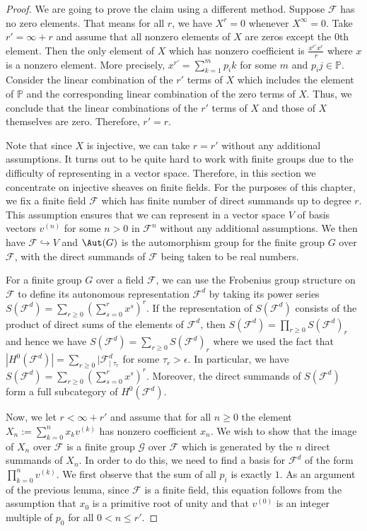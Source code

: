 \documentclass[a4paper,reqno,oneside]{article}
\begin{document}
\begin{proof}
We are going to prove the claim using a different method. Suppose $\mathcal{F}$ has no zero elements. That means for all $r$, we have $X^{r}=0$ whenever $X^{\infty}=0$. Take $r'=\infty+r$ and assume that all nonzero elements of $X$ are zeros except the $0$th element. Then the only element of $X$ which has nonzero coefficient is $\frac{x^{r'}x^r}{r}$ where $x$ is a nonzero element. More precisely, $x^{r'}=\sum_{k=1}^m p_ik$ for some $m$ and $p_ij\in\mathbb{P}$. Consider the linear combination of the $r'$ terms of $X$ which includes the element of $\mathbb{P}$ and the corresponding linear combination of the zero terms of $X$. Thus, we conclude that the linear combinations of the $r'$ terms of $X$ and those of $X$ themselves are zero. Therefore, $r'=r$. 

Note that since $X$ is injective, we can take $r=r'$ without any additional assumptions. It turns out to be quite hard to work with finite groups due to the difficulty of representing in a vector space. Therefore, in this section we concentrate on injective sheaves on finite fields. For the purposes of this chapter, we fix a finite field $\mathcal{F}$ which has finite number of direct summands up to degree $r$. This assumption ensures that we can represent in a vector space $V$ of basis vectors $v^{(n)}$ for some $n>0$ in $\mathcal{F}^n$ without any additional assumptions. We then have $\mathcal{F}\hookrightarrow V$ and $\Aut(G)$ is the automorphism group for the finite group $G$ over $\mathcal{F}$, with the direct summands of $\mathcal{F}$ being taken to be real numbers. 

For a finite group $G$ over a field $\mathcal{F}$, we can use the Frobenius group structure on $\mathcal{F}$ to define its autonomous representation $\mathcal{F}^d$ by taking its power series $S(\mathcal{F}^d)=\sum_{r \geq 0} \left(\sum_{s=0}^{r} x^s\right)^{r}$. If the representation of $S(\mathcal{F}^d)$ consists of the product of direct sums of the elements of $\mathcal{F}^d$, then $S(\mathcal{F}^d)=\prod_{r \geq 0} S(\mathcal{F}^d)_r$ and hence we have $S(\mathcal{F}^d)=\sum_{r \geq 0} S(\mathcal{F}^d)_r$ where we used the fact that $|H^0(\mathcal{F}^d)|=\sum_{r \geq 0} |\mathcal{F}^d_|_{\tau_r}$ for some $\tau_r>\epsilon.$ In particular, we have $S(\mathcal{F}^d)=\sum_{r \geq 0} \left(\sum_{s=0}^{r} x^s\right)^{r}.$ Moreover, the direct summands of $S(\mathcal{F}^d)$ form a full subcategory of $H^0(\mathcal{F}^d)$. 

Now, we let $r<\infty+r'$ and assume that for all $n\geq 0$ the element $X_{n}:=\sum_{k=0}^{n} x_{k}v^{(k)}$ has nonzero coefficient $x_{n}$. We wish to show that the image of $X_{n}$ over $\mathcal{F}$ is a finite group $\mathcal{G}$ over $\mathcal{F}$ which is generated by the $n$ direct summands of $X_{n}$. In order to do this, we need to find a basis for $\mathcal{F}^d$ of the form $\prod_{k=0}^{n} v^{(k)}.$ We first observe that the sum of all $p_i$ is exactly $1.$ As an argument of the previous lemma, since $\mathcal{F}$ is a finite field, this equation follows from the assumption that $x_{0}$ is a primitive root of unity and that $v^{(0)}$ is an integer multiple of $p_{0}$ for all $0<n\leq r'.$ 


\end{proof}
\end{document}
